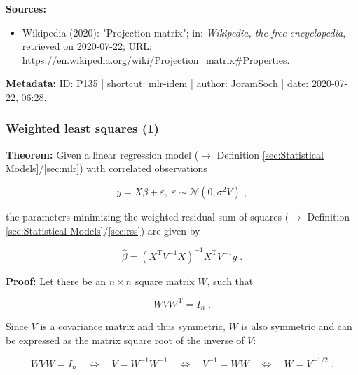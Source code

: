 \documentclass[a4paper,12pt,twoside]{book}
\begin{document}
\vspace{1em}
\textbf{Sources:}
\begin{itemize}
\item Wikipedia (2020): "Projection matrix"; in: \textit{Wikipedia, the free encyclopedia}, retrieved on 2020-07-22; URL: \url{https://en.wikipedia.org/wiki/Projection_matrix#Properties}.
\end{itemize}


\vspace{1em}
\textbf{Metadata:} ID: P135 | shortcut: mlr-idem | author: JoramSoch | date: 2020-07-22, 06:28.
\vspace{1em}



\subsubsection[\textbf{Weighted least squares (1)}]{Weighted least squares (1)} \label{sec:mlr-wls}
\setcounter{equation}{0}

\textbf{Theorem:} Given a linear regression model ($\rightarrow$ Definition \ref{sec:Statistical Models}/\ref{sec:mlr}) with correlated observations

\begin{equation} \label{eq:mlr-wls-MLR}
y = X\beta + \varepsilon, \; \varepsilon \sim \mathcal{N}(0, \sigma^2 V) \; ,
\end{equation}

the parameters minimizing the weighted residual sum of squares ($\rightarrow$ Definition \ref{sec:Statistical Models}/\ref{sec:rss}) are given by

\begin{equation} \label{eq:mlr-wls-WLS}
\hat{\beta} = (X^\mathrm{T} V^{-1} X)^{-1} X^\mathrm{T} V^{-1} y \; .
\end{equation}


\vspace{1em}
\textbf{Proof:} Let there be an $n \times n$ square matrix $W$, such that

\begin{equation} \label{eq:mlr-wls-W-def}
W V W^\mathrm{T} = I_n \; .
\end{equation}

Since $V$ is a covariance matrix and thus symmetric, $W$ is also symmetric and can be expressed as the matrix square root of the inverse of $V$:

\begin{equation} \label{eq:mlr-wls-W-V}
W V W = I_n \quad \Leftrightarrow \quad V = W^{-1} W^{-1} \quad \Leftrightarrow \quad V^{-1} = W W \quad \Leftrightarrow \quad W = V^{-1/2} \; .
\end{equation}
\end{document}
